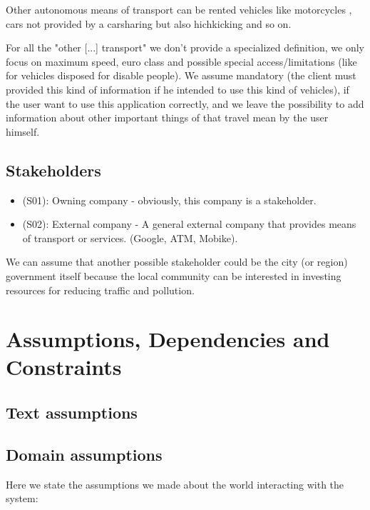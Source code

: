 \documentclass[a4paper,leqno]{book}
\begin{document}
Other autonomous means of transport can be rented vehicles like motorcycles , cars not provided by a carsharing but also hichkicking and so on.

For all the "other [...] transport" we don't provide a specialized definition, we only focus on maximum speed, euro class and possible special access/limitations (like for vehicles disposed for disable people). We assume mandatory (the client must provided this kind of information if he intended to use this kind of vehicles), if the user want to use this application correctly, and we leave the possibility to add information about other important things of that travel mean by the user himself.


\subsection{Stakeholders}
\begin{itemize}

\item (S01): Owning company - obviously, this company is a stakeholder.
\item (S02): External company - A general external company that provides means of transport or services. (Google, ATM, Mobike).

\end{itemize}

We can assume that another possible stakeholder could be the city (or region) government itself because the local community can be interested in investing resources for reducing traffic and pollution.\\

\section{Assumptions, Dependencies and Constraints}
\subsection{Text assumptions}

\subsection{Domain assumptions}
Here we state the assumptions we made about the world interacting with the system:
\end{document}
